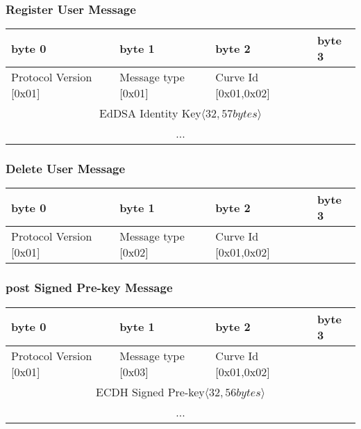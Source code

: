 \documentclass[a4paper,11pt]{article}
\begin{document}
    \subsubsection{Register User Message}
      \begin{center}
      \begin{tabular}{ | p{1.4in} | p{1.4in} | p{1.4in} | p{1.4in} |}
        \hline
        \cellcolor[gray]{0.85} byte 0 & \cellcolor[gray]{0.85} byte 1 & \cellcolor[gray]{0.85} byte 2 & \cellcolor[gray]{0.85}byte 3\\
        \hline
        Protocol Version [0x01] & Message type [0x01] & Curve Id [0x01,0x02] &\\
        \cline{1-3}
        \multicolumn{4}{|c|}{EdDSA Identity Key$\langle 32,57bytes\rangle $}\\
        \multicolumn{4}{|c|}{...}\\
        \hline
      \end{tabular}
      \end{center}
    
    \subsubsection{Delete User Message}
      \begin{center}
      \begin{tabular}{ | p{1.4in} | p{1.4in} | p{1.4in} | p{1.4in} |}
        \hline
        \cellcolor[gray]{0.85} byte 0 & \cellcolor[gray]{0.85} byte 1 & \cellcolor[gray]{0.85} byte 2 & \cellcolor[gray]{0.85}byte 3\\
        \hline
        Protocol Version [0x01] & Message type [0x02] & Curve Id [0x01,0x02] & \\
        \hline
      \end{tabular}
      \end{center}

    \subsubsection{post Signed Pre-key Message}
      \begin{center}
      \begin{tabular}{ | p{1.4in} | p{1.4in} | p{1.4in} | p{1.4in} |}
        \hline
        \cellcolor[gray]{0.85} byte 0 & \cellcolor[gray]{0.85} byte 1 & \cellcolor[gray]{0.85} byte 2 & \cellcolor[gray]{0.85}byte 3\\
        \hline
        Protocol Version [0x01] & Message type [0x03] & Curve Id [0x01,0x02] & \\
        \cline{1-3}
        \multicolumn{4}{|c|}{ECDH Signed Pre-key$\langle 32,56bytes\rangle $}\\
        \multicolumn{4}{|c|}{...}\\
        \hline
      \end{tabular}
      \end{center}
    
\end{document}
